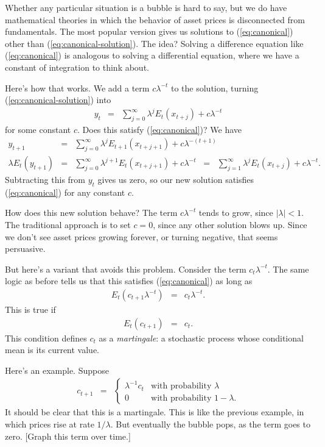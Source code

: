 \documentclass[11pt]{article}
\begin{document}
Whether any particular situation is a bubble is hard to say,
but we do have mathematical theories in which the behavior of asset prices is
disconnected from fundamentals.
The most popular version gives us solutions to (\ref{eq:canonical})
other than (\ref{eq:canonical-solution}).
The idea?
Solving a difference equation like (\ref{eq:canonical}) is analogous to solving a differential
equation, where we have a constant of integration to think about.

Here's how that works.
We add a term $c \lambda^{-t}$ to the solution, turning (\ref{eq:canonical-solution}) into
\begin{eqnarray*}
    y_t &=&  \sum_{j=0}^\infty \lambda^j E_t (x_{t+j}) + c \lambda^{-t}
\end{eqnarray*}
for some constant $c$.
Does this satisfy (\ref{eq:canonical})?
We have
\begin{eqnarray*}
    y_{t+1} &=& \sum_{j=0}^\infty \lambda^{j} E_{t+1} (x_{t+j+1}) + c \lambda^{-(t+1)} \\
    \lambda E_t(y_{t+1})
        &=& \sum_{j=0}^\infty \lambda^{j+1} E_t (x_{t+j+1}) + c \lambda^{-t}
        \;\;=\;\; \sum_{j=1}^\infty \lambda^{j} E_t (x_{t+j}) + c \lambda^{-t} .
\end{eqnarray*}
Subtracting this from $y_t$ gives us zero, so our new solution satisfies
(\ref{eq:canonical}) for any constant $c$.

How does this new solution behave?  The term $c \lambda^{-t}$ tends to grow,
since $ |\lambda| < 1$.  The traditional approach is to set $c=0$, since
any other solution blows up.
Since we don't see asset prices growing forever, or turning negative,
that seems persuasive.

But here's a variant that avoids this problem.
Consider the term $c_t \lambda^{-t}$.
The same logic as before tells us that this satisfies (\ref{eq:canonical})
as long as
\begin{eqnarray*}
    E_t (c_{t+1} \lambda^{-t}) &=& c_{t} \lambda^{-t} .
\end{eqnarray*}
This is true if
\begin{eqnarray*}
    E_t (c_{t+1}) &=& c_t .
\end{eqnarray*}
This condition defines $c_t$ as a {\it martingale\/}:  a stochastic process
whose conditional mean is its current value.

Here's an example.  Suppose
\begin{eqnarray*}
    c_{t+1} &=&
            \left\{
            \begin{array}{ll}
            \lambda^{-1} c_t & \mbox{with probability } \lambda \\
            0       &  \mbox{with probability } 1-\lambda .
            \end{array}
            \right.
\end{eqnarray*}
It should be clear that this is a martingale.
This is like the previous example, in which prices rise at rate $1/\lambda$.
But eventually the bubble pops, as the term goes to zero.
[Graph this term over time.]
\end{document}
